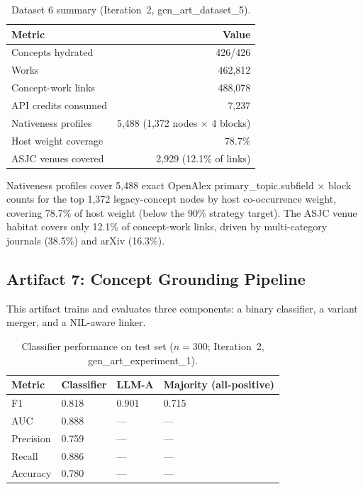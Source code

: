 \documentclass[11pt,letterpaper]{article}
\begin{document}
\begin{table}[!htbp]
\centering
\caption{Dataset 6 summary (Iteration~2, gen\_art\_dataset\_5).}
\label{tab:dataset6}
\begin{tabular}{lr}
\toprule
Metric & Value \\
\midrule
Concepts hydrated & 426/426 \\
Works & 462,812 \\
Concept-work links & 488,078 \\
API credits consumed & 7,237 \\
Nativeness profiles & 5,488 (1,372 nodes $\times$ 4 blocks) \\
Host weight coverage & 78.7\% \\
ASJC venues covered & 2,929 (12.1\% of links) \\
\bottomrule
\end{tabular}
\end{table}

Nativeness profiles cover 5,488 exact OpenAlex primary\_topic.subfield $\times$ block counts for the top 1,372 legacy-concept nodes by host co-occurrence weight, covering 78.7\% of host weight (below the 90\% strategy target). The ASJC venue habitat covers only 12.1\% of concept-work links, driven by multi-category journals (38.5\%) and arXiv (16.3\%).

\subsection{Artifact 7: Concept Grounding Pipeline}

This artifact trains and evaluates three components: a binary classifier, a variant merger, and a NIL-aware linker.

\begin{table}[!htbp]
\centering
\caption{Classifier performance on test set ($n = 300$; Iteration~2, gen\_art\_experiment\_1).}
\label{tab:classifier}
\begin{tabular}{L{3cm}R{1.5cm}R{1.5cm}R{2.5cm}}
\toprule
Metric & Classifier & LLM-A & Majority (all-positive) \\
\midrule
F1 & 0.818 & 0.901 & 0.715 \\
AUC & 0.888 & --- & --- \\
Precision & 0.759 & --- & --- \\
Recall & 0.886 & --- & --- \\
Accuracy & 0.780 & --- & --- \\
\bottomrule
\end{tabular}
\end{table}
\end{document}
